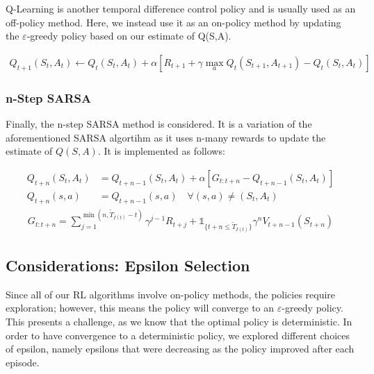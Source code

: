 \documentclass[final,12pt,3p]{elsarticle}
\begin{document}
Q-Learning is another temporal difference control policy and is usually used as an off-policy method. Here, we instead use it as an on-policy method by updating the $\varepsilon$-greedy policy based on our estimate of Q(S,A). 

\begin{align*}
    Q_{t+1}(S_t,A_t) \leftarrow Q_{t}(S_t,A_t) + \alpha[R_{t+1} + \gamma\max_{a}Q_t(S_{t+1},A_{t+1}) - Q_t(S_t,A_t)]
\end{align*}

\subsubsection{n-Step SARSA}
\vspace{12pt}

Finally, the n-step SARSA method is considered. It is a variation of the aforementioned SARSA algortihm as it uses n-many rewards to update the estimate of $Q(S, A)$. It is implemented as follows:

\begin{align*}
    Q_{t+n}(S_t, A_t) &= Q_{t+n-1}(S_t, A_t) + \alpha[G_{t:t+n} - Q_{t+n-1}(S_t, A_t)] \\
    Q_{t+n}(s, a) &= Q_{t+n-1}(s, a) \quad \forall (s, a) \neq (S_t, A_t)
\end{align*}
\begin{align*}
    G_{t:t+n} = \sum_{j=1}^{\min(n, \tilde{T}_{I(t)}-t)}\gamma^{j-1}R_{t+j} + \mathds{1}_{\{t+n \leq \tilde{T}_{I(t)}\}} \gamma^nV_{t+n-1}(S_{t+n})
\end{align*}


\subsection{Considerations: Epsilon Selection}
\vspace{12pt}

Since all of our RL algorithms involve on-policy methods, the policies require exploration; however, this means the policy will converge to an $\varepsilon$-greedy policy. This presents a challenge, as we know that the optimal policy is deterministic. In order to have convergence to a deterministic policy, we explored different choices of epsilon, namely epsilons that were decreasing as the policy improved after each episode.
\end{document}
